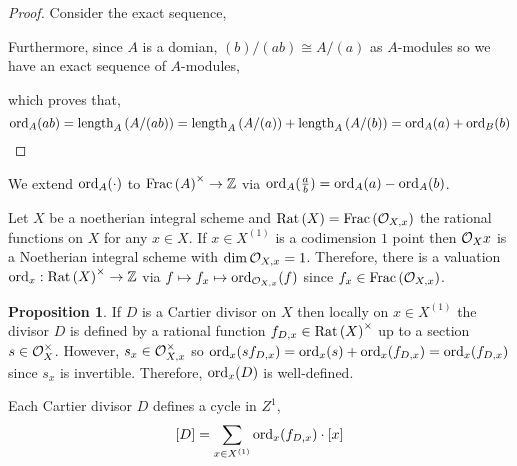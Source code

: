 \documentclass[12pt]{extarticle}
\newcommand{\Z}{\mathbb{Z}}
\theoremstyle{definition}
\newtheorem{proposition}[theorem]{Proposition}
\newenvironment{definition}[1][Definition:]{\begin{trivlist}
\item[\hskip \labelsep {\bfseries #1}]}{\end{trivlist}}
\begin{document}
\begin{proof}
Consider the exact sequence,
\begin{center}
\end{center}
Furthermore, since $A$ is a domian, $(b) / (ab) \cong A / (a)$ as $A$-modules so we have an exact sequence of $A$-modules,
\begin{center}
\end{center}
which proves that,
\[ \mathrm{ord}_A(ab) = \mathrm{length}_{A}\left( A /(ab) \right) = \mathrm{length}_{A}\left( A / (a) \right) + \mathrm{length}_{A}\left( A/(b) \right) = \mathrm{ord}_A(a) + \mathrm{ord}_B(b) \]
\end{proof}

\begin{definition}
We extend $\mathrm{ord}_A(\cdot)$ to $\Frac{A}^\times \to \Z$ via $\mathrm{ord}_A(\frac{a}{b}) = \mathrm{ord}_A(a) - \mathrm{ord}_A(b)$.
\end{definition}

\begin{definition}
Let $X$ be a noetherian integral scheme and $\mathrm{Rat} \left( X \right) = \mathrm{Frac} \left( \mathcal{O}_{X, x} \right)$ the rational functions on $X$ for any $x \in X$. If $x \in X^{(1)}$ is a codimension $1$ point then $\mathcal{O}_{X}{x}$ is a Noetherian integral scheme with $\dim{\mathcal{O}_{X, x}} = 1$. Therefore, there is a valuation $\ord_x : \Rat{X}^\times \to \Z$ via $f \mapsto f_x \mapsto \mathrm{ord}_{\mathcal{O}_{X, x}}(f)$ since $f_x \in \mathrm{Frac} \left( \mathcal{O}_{X, x} \right)$. 
\end{definition}

\begin{proposition}
If $D$ is a Cartier divisor on $X$ then locally on $x \in X^{(1)}$ the divisor $D$ is defined by a rational function $f_{D,x} \in \mathrm{Rat} \left( X \right)^\times$ up to a section $s \in \mathcal{O}_{X}^\times$. However, $s_x \in \mathcal{O}_{X, x}^\times$ so $\mathrm{ord}_{x}(s f_{D,x}) = \mathrm{ord}_{x}(s) + \mathrm{ord}_x(f_{D,x}) = \mathrm{ord}_x(f_{D,x})$ since $s_x$ is invertible. Therefore, $\mathrm{ord}_x(D)$ is well-defined.
\end{proposition}

\begin{definition}
Each Cartier divisor $D$ defines a cycle in $Z^1$,
\[ [D] = \sum_{x \in X^{(1)}} \mathrm{ord}_x(f_{D, x}) \cdot [x] \]
\end{definition}
\end{document}
